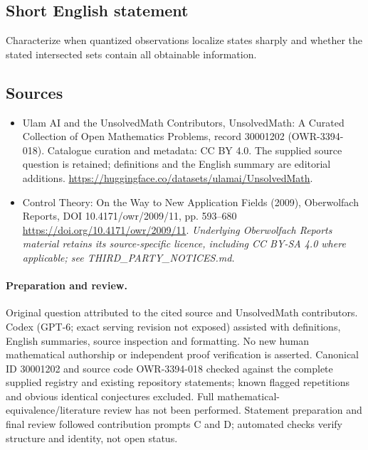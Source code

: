 \documentclass[11pt]{article}
\begin{document}
\subsection{Short English statement}
Characterize when quantized observations localize states sharply and whether the stated intersected sets contain all obtainable information.
\subsection{Sources}
\begin{itemize}
\item[\hypertarget{source:30001202:1}{S1}] Ulam AI and the UnsolvedMath Contributors, UnsolvedMath: A Curated Collection of Open Mathematics Problems, record 30001202 (OWR-3394-018). Catalogue curation and metadata: CC BY 4.0. The supplied source question is retained; definitions and the English summary are editorial additions.
\url{https://huggingface.co/datasets/ulamai/UnsolvedMath}.
\item[\hypertarget{source:30001202:2}{S2}] Control Theory: On the Way to New Application Fields (2009), Oberwolfach Reports, DOI 10.4171/owr/2009/11, pp. 593--680
\url{https://doi.org/10.4171/owr/2009/11}.
\textit{Underlying Oberwolfach Reports material retains its source-specific licence, including CC BY-SA 4.0 where applicable; see THIRD\_PARTY\_NOTICES.md.}
\end{itemize}
\paragraph{Preparation and review.}
Original question attributed to the cited source and UnsolvedMath contributors. Codex (GPT-6; exact serving revision not exposed) assisted with definitions, English summaries, source inspection and formatting. No new human mathematical authorship or independent proof verification is asserted. Canonical ID 30001202 and source code OWR-3394-018 checked against the complete supplied registry and existing repository statements; known flagged repetitions and obvious identical conjectures excluded. Full mathematical-equivalence/literature review has not been performed. Statement preparation and final review followed contribution prompts C and D; automated checks verify structure and identity, not open status.
\label{end:30001202}
\end{document}
